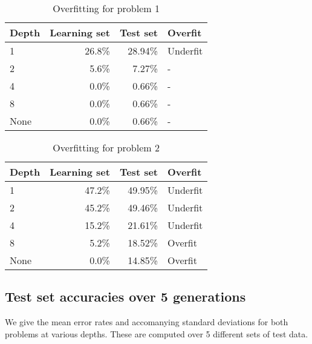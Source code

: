 \documentclass{article}
\begin{document}
\begin{table}[h]
  \centering
	\begin{tabular}{l|r|r|l} %
	      \textbf{Depth} & \textbf{Learning set} & \textbf{Test set} & \textbf{Overfit} \\
	      \hline
	      1 & 26.8\% & 28.94\% & Underfit \\
2 & 5.6\% & 7.27\% & - \\
4 & 0.0\% & 0.66\% & - \\
8 & 0.0\% & 0.66\% & - \\
None & 0.0\% & 0.66\% & - \\
	\end{tabular}
  \caption{\label{overfitting1}Overfitting for problem 1}
\end{table}
	
\begin{table}[h]
  \centering
	\begin{tabular}{l|r|r|l} %
	      \textbf{Depth} & \textbf{Learning set} & \textbf{Test set} & \textbf{Overfit} \\
	      \hline
    1 & 47.2\% & 49.95\% & Underfit \\
2 & 45.2\% & 49.46\% & Underfit \\
4 & 15.2\% & 21.61\% & Underfit \\
8 & 5.2\% & 18.52\% & Overfit \\
None & 0.0\% & 14.85\% & Overfit \\

	\end{tabular}
  \caption{\label{overfitting2}Overfitting for problem 2}
\end{table}



	

\subsection{Test set accuracies over 5 generations}

We give the mean error rates and accomanying standard deviations for both problems at various depths. These are computed over 5 different sets of test data.
\end{document}
